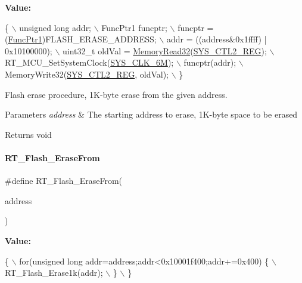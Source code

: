 {\bfseries Value\+:}
\begin{DoxyCode}
\{                                                   \(\backslash\)
        unsigned \textcolor{keywordtype}{long} addr;                             \(\backslash\)
        FuncPtr1 funcptr;                               \(\backslash\)
        funcptr =  (\mbox{\hyperlink{a00020_a0891965816a5b721b07f7bebefaf7430}{FuncPtr1}})FLASH\_ERASE\_ADDRESS;       \(\backslash\)
        addr = ((address&0x1ffff) | 0x10100000);        \(\backslash\)
        uint32\_t oldVal = \mbox{\hyperlink{a00020_a2d484dc15bdf30ee11ab3b05f31f0e16}{MemoryRead32}}(\mbox{\hyperlink{a00020_ae6a98a78f9ac0c75c18c7d4e2c62fdcb}{SYS\_CTL2\_REG}});   \(\backslash\)
        RT\_MCU\_SetSystemClock(\mbox{\hyperlink{a00020_a8ddc6e06a91f5506443cdef0458729df}{SYS\_CLK\_6M}});              \(\backslash\)
        funcptr(addr);                                  \(\backslash\)
        MemoryWrite32(\mbox{\hyperlink{a00020_ae6a98a78f9ac0c75c18c7d4e2c62fdcb}{SYS\_CTL2\_REG}}, oldVal);            \(\backslash\)
    \}
\end{DoxyCode}


Flash erase procedure, 1\+K-\/byte erase from the given address. 


\begin{DoxyParams}{Parameters}
{\em address} & The starting address to erase, 1\+K-\/byte space to be erased \\
\hline
\end{DoxyParams}
\begin{DoxyReturn}{Returns}
void 
\end{DoxyReturn}
\mbox{\label{a00008_afb9cdf54d7254cfef685cd4012113b27}} 
\paragraph{\texorpdfstring{R\+T\+\_\+\+Flash\+\_\+\+Erase\+From}{RT\_Flash\_EraseFrom}}
{\footnotesize\ttfamily \#define R\+T\+\_\+\+Flash\+\_\+\+Erase\+From(\begin{DoxyParamCaption}\item[{}]{address }\end{DoxyParamCaption})}

{\bfseries Value\+:}
\begin{DoxyCode}
\{                                                                   \(\backslash\)
        for(\textcolor{keywordtype}{unsigned} \textcolor{keywordtype}{long} addr=address;addr<0x10001f400;addr+=0x400) \{  \(\backslash\)
            RT\_Flash\_Erase1k(addr);                                     \(\backslash\)
        \}                                                               \(\backslash\)
    \}
\end{DoxyCode}


